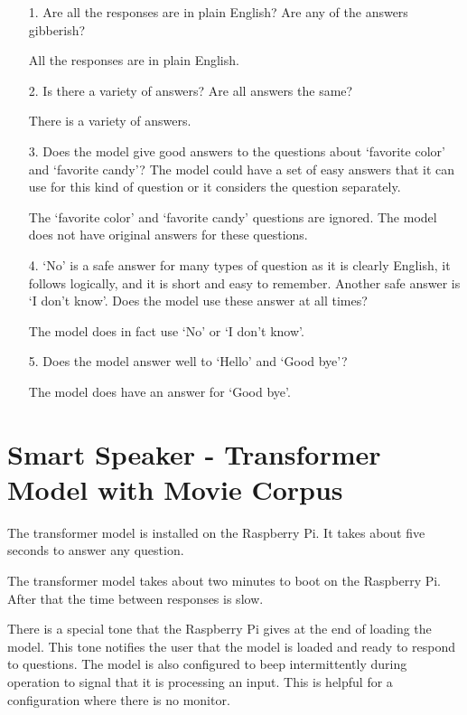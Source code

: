 \begin{itemize}
	\item [1.] Are all the responses are in plain English? Are any of the answers gibberish?
	
	\item []All the responses are in plain English. 
	
	\item [2.] Is there a  variety of answers? Are all answers the same?
	
	\item []There is a variety of answers. 
	
	\item [3.] Does the model give good answers to the questions about `favorite color' and `favorite candy'? The model could have a set of easy answers that it can use for this kind of question or it considers the question separately. 
	
	\item []The `favorite color' and `favorite candy' questions are ignored. The model does not have original answers for these questions.
	
	\item [4.] `No' is a safe answer for many types of question as it is clearly English, it follows logically, and it is short and easy to remember. Another safe answer is `I don't know'. Does the model use these answer at all times?
	
	\item []The model does in fact use `No' or `I don't know'. 
	
	\item [5.] Does the model answer well to `Hello' and `Good bye'?
	
	\item []The model does have an answer for `Good bye'.
\end{itemize}

\section{Smart Speaker - Transformer Model with Movie Corpus}

The transformer model is installed on the Raspberry Pi. It takes about five seconds to answer any question.

The transformer model takes about two minutes to boot on the Raspberry Pi. After that the time between responses is slow. 

There is a special tone that the Raspberry Pi gives at the end of loading the model. This tone notifies the user that the model is loaded and ready to respond to questions. The model is also configured to beep intermittently during operation to signal that it is processing an input. This is helpful for a configuration where there is no monitor.

